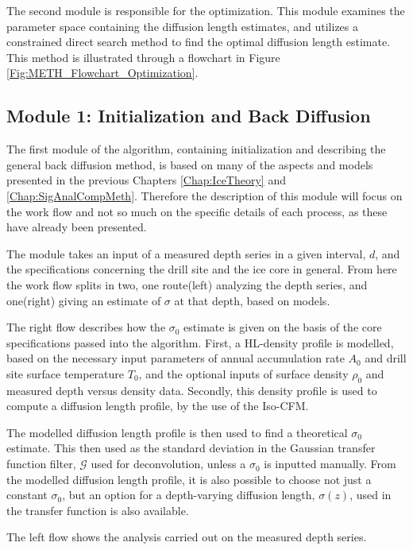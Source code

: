 \documentclass[../../CompleteThesis2/Complete_2ndDraft]{subfiles}
\begin{document}
The second module is responsible for the optimization. This module examines the parameter space containing the diffusion length estimates, and utilizes a constrained direct search method to find the optimal diffusion length estimate. This method is illustrated through a flowchart in Figure \ref{Fig:METH_Flowchart_Optimization}. 

\subsection{Module 1: Initialization and Back Diffusion}
The first module of the algorithm, containing initialization and describing the general back diffusion method, is based on many of the aspects and models presented in the previous Chapters \ref{Chap:IceTheory} and \ref{Chap:SigAnalCompMeth}. Therefore the description of this module will focus on the work flow and not so much on the specific details of each process, as these have already been presented. 

The module takes an input of a measured depth series in a given interval, $d$, and the specifications concerning the drill site and the ice core in general. From here the work flow splits in two, one route(left) analyzing the depth series, and one(right) giving an estimate of $\sigma$ at that depth, based on models.

The right flow describes how the $\sigma_0$ estimate is given on the basis of the core specifications passed into the algorithm. First, a HL-density profile is modelled, based on the necessary input parameters of annual accumulation rate $A_0$ and drill site surface temperature $T_0$, and the optional inputs of surface density $\rho_0$ and measured depth versus density data. Secondly, this density profile is used to compute a diffusion length profile, by the use of the Iso-CFM. 

The modelled diffusion length profile is then used to find a theoretical $\sigma_0$ estimate. This then used as the standard deviation in the Gaussian transfer function filter, $\mathcal{G}$ used for deconvolution, unless a $\sigma_0$ is inputted manually. From the modelled diffusion length profile, it is also possible to choose not just a constant $\sigma_0$, but an option for a depth-varying diffusion length, $\sigma(z)$, used in the transfer function is also available. 

The left flow shows the analysis carried out on the measured depth series.
\end{document}

